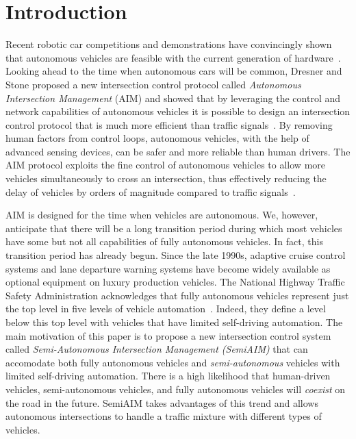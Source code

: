 \section{Introduction}
\label{sec:introduction}

Recent robotic car competitions and demonstrations have convincingly
shown that autonomous vehicles are feasible with the current
generation of hardware~\cite{mybib:Darpa07Urban}. Looking ahead to the
time when autonomous cars will be common, Dresner and Stone proposed a
new intersection control protocol called \emph{Autonomous Intersection
Management} (AIM) and showed that by leveraging the control and
network capabilities of autonomous vehicles it is possible to design
an intersection control protocol that is much more efficient than
traffic signals~\cite{bib:Dresner08Multiagent}.  By removing human
factors from control loops, autonomous vehicles, with the help of
advanced sensing devices, can be safer and more reliable than human
drivers.  The AIM protocol exploits the fine control of autonomous
vehicles to allow more vehicles simultaneously to cross an
intersection, thus effectively reducing the delay of vehicles by
orders of magnitude compared to traffic
signals~\cite{bib:Fajardo12Automated}.

AIM is designed for the time when vehicles are autonomous.  We,
however, anticipate that there will be a long transition period during
which most vehicles have some but not all capabilities of fully
autonomous vehicles.  In fact, this transition period has already
begun. Since the late 1990s, adaptive cruise control systems and lane
departure warning systems have become widely available as optional
equipment on luxury production vehicles. 
% 
The National Highway Traffic Safety Administration acknowledges that
fully autonomous vehicles represent just the top level in five levels
of vehicle automation~\cite{bib:NHTSA13Preliminary}. Indeed, they
define a level below this top level with vehicles that
have limited self-driving automation.
The main motivation of this paper is to
propose a new intersection control system called
\emph{Semi-Autonomous Intersection Management (SemiAIM)} that can
accomodate both fully autonomous vehicles and
\emph{semi-autonomous} vehicles with limited self-driving automation.
There is a high likelihood that
human-driven vehicles, semi-autonomous vehicles, and fully autonomous
vehicles will \emph{coexist} on the road in the future.  SemiAIM takes
advantages of this trend and allows autonomous intersections to handle
a traffic mixture with different types of vehicles.

